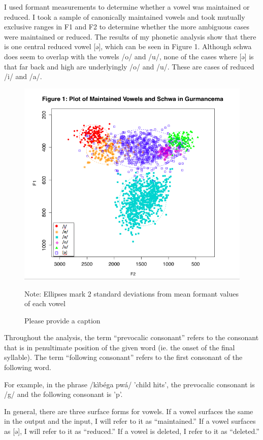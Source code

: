 \documentclass[output=paper,newtxmath,modfonts,nonflat,draftmode]{langsci/langscibook}
\begin{document}
I used formant measurements to determine whether a vowel was maintained or reduced. I took a sample of canonically maintained vowels and took mutually exclusive ranges in F1 and F2 to determine whether the more ambiguous cases were maintained or reduced. The results of my phonetic analysis show that there is one central reduced vowel [ə], which can be seen in Figure 1. Although schwa does seem to overlap with the vowels /o/ and /u/, none of the cases where [ə] is that far back and high are underlyingly /o/ and /u/. These are cases of reduced /i/ and /a/.



\begin{figure} 
\includegraphics[width=\linewidth]{figures/ACAL_Vowel_plot.png}
\caption{{\color{red} Please provide a caption}}
  Note: Ellipses mark 2 standard deviations from mean formant values of each vowel
  \end{figure}
 

Throughout the analysis, the term “prevocalic consonant” refers to the consonant that is in penultimate position of the given word (ie. the onset of the final syllable). The term “following consonant” refers to the first consonant of the following word. 

For example, in the phrase /kìbéga pwá/ 'child hits', the prevocalic consonant is /g/ and the following consonant is 'p'. 

In general, there are three surface forms for vowels. If a vowel surfaces the same in the output and the input, I will refer to it as “maintained.” If a vowel surfaces as [ə], I will refer to it as “reduced.” If a vowel is deleted, I refer to it as “deleted.”
\end{document}
